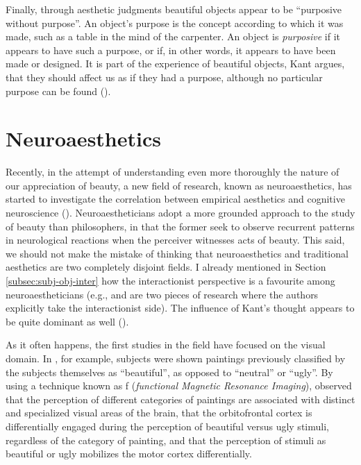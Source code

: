Finally, through aesthetic judgments beautiful objects appear to be ``purposive without purpose''. An object's purpose is the concept according to which it was made, such as a table in the mind of the carpenter. An object is \emph{purposive} if it appears to have such a purpose, or if, in other words, it appears to have been made or designed. It is part of the experience of beautiful objects, Kant argues, that they should affect us as if they had a purpose, although no particular purpose can be found (\cite{kant2001critique}).

\section{Neuroaesthetics}\label{sec:neuroaesthetics}
Recently, in the attempt of understanding even more thoroughly the nature of our appreciation of beauty, a new field of research, known as neuroaesthetics, has started to investigate the correlation between empirical aesthetics and cognitive neuroscience (\cite{pearce2016neuroaesthetics}). Neuroaestheticians adopt a more grounded approach to the study of beauty than philosophers, in that the former seek to observe recurrent patterns in neurological reactions when the perceiver witnesses acts of beauty. This said, we should not make the mistake of thinking that neuroaesthetics and traditional aesthetics are two completely disjoint fields. I  already mentioned in Section \ref{subsec:subj-obj-inter} how the interactionist perspective is a favourite among neuroaestheticians (e.g., \cite{juslin2013everyday} and \cite{reber2004processing} are two pieces of research where the authors explicitly take the interactionist side). The influence of Kant's thought appears to be quite dominant as well (\cite{conway2013neuroaesthetics}).

As it often happens, the first studies in the field have focused on the visual domain. In \cite{kawabata2004neural}, for example, subjects were shown paintings previously classified by the subjects themselves as ``beautiful'', as opposed to ``neutral'' or ``ugly''. By using a technique known as f (\emph{functional Magnetic Resonance Imaging}), \citeauthor{kawabata2004neural} observed that the perception of different categories of paintings are associated with distinct and specialized visual areas of the brain, that the orbitofrontal cortex is differentially engaged during the perception of beautiful versus ugly stimuli, regardless of the category of painting, and that the perception of stimuli as beautiful or ugly mobilizes the motor cortex differentially. 

